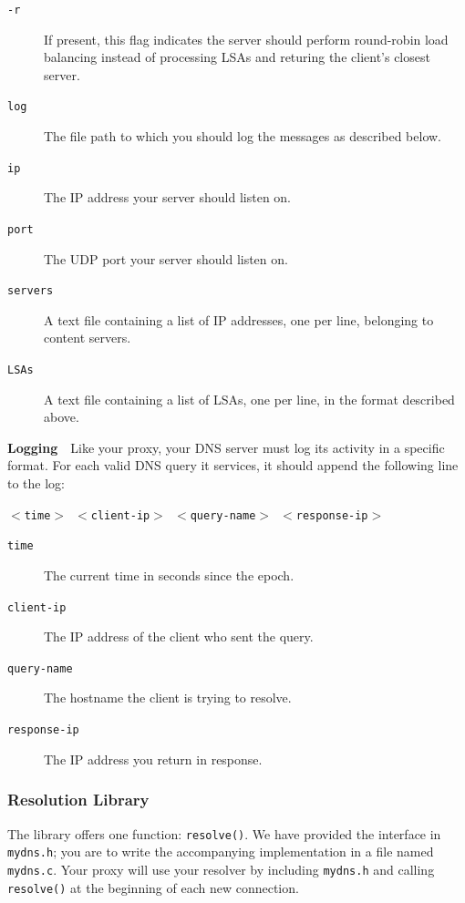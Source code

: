 \documentclass{article}
\begin{document}
\begin{description}
	\item[\texttt{-r}] If present, this flag indicates the server should
	perform round-robin load balancing instead of processing LSAs and returing
	the client's closest server.
	\item[\texttt{log}] The file path to which you should log the messages
	as described below.
	\item[\texttt{ip}] The IP address your server should listen on.
	\item[\texttt{port}] The UDP port your server should listen on.
	\item[\texttt{servers}] A text file containing a list of IP addresses, one
	per line, belonging to content servers.
	\item[\texttt{LSAs}] A text file containing a list of LSAs, one per line,
	in the format described above.
\end{description}

\bigskip \noindent \textbf{Logging}~~Like your proxy, your DNS server must log
its activity in a specific format.  For each valid DNS query it services, it
should append the following line to the log:
\begin{center}
	\texttt{$<$time$>$ $<$client-ip$>$ $<$query-name$>$ $<$response-ip$>$}
\end{center}

\begin{description}
	\item[\texttt{time}] The current time in seconds since the epoch.
	\item[\texttt{client-ip}] The IP address of the client who sent the query.
	\item[\texttt{query-name}] The hostname the client is trying to resolve.
	\item[\texttt{response-ip}] The IP address you return in response.
\end{description}



\subsubsection{Resolution Library}
The library offers one function: \texttt{resolve()}. We have provided the
interface in \texttt{mydns.h}; you are to write the accompanying implementation
in a file named \texttt{mydns.c}. Your proxy will use your resolver by
including \texttt{mydns.h} and calling \texttt{resolve()} at the beginning of
each new connection.
\end{document}
